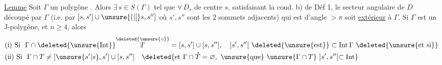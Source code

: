 \uline{Lemme} Soit $\Gamma$ un polygône  . Alors $\exists\,s\in S(\Gamma)$  tel que $\forall\,D_s$ de centre $s$,  satisfaisant la cond. b) de Déf 1, le secteur angulaire de $D$ découpé par $\Gamma$ (i.e. par $[s,s']\cup\unsure{(|[}s,s'']$ où $s',s''$ sont les $2$ sommets adjacents) qui est d'angle $>\pi$ soit \uline{extérieur} à $\Gamma$. Si $\Gamma$ est un J-polygône, et $n\ge4$, alors
\[
\begin{aligned}
&\text{(i) Si }\ \Gamma\cap\deleted{\unsure{\operatorname{Int}}}\overset{\deleted{\unsure{\circ}}}{T}=[s,s']\cup[s,s''],\quad ]s',s''[\ \deleted{\unsure{\text{est}}}\subset\operatorname{Int}\Gamma\ \text{\deleted{\unsure{et si}}}\\
&\text{(ii) Si }\ \Gamma\cap T\ne[\unsure{s'|s},s']\cup[s,s'']\quad
\deleted{\text{et }\Gamma\cap\mathring{T}=\varnothing,\ \unsure{\text{que}}\ \unsure{\Gamma\cap T}\ ]s',s''[\subset\operatorname{Int}}
\end{aligned}
\]
